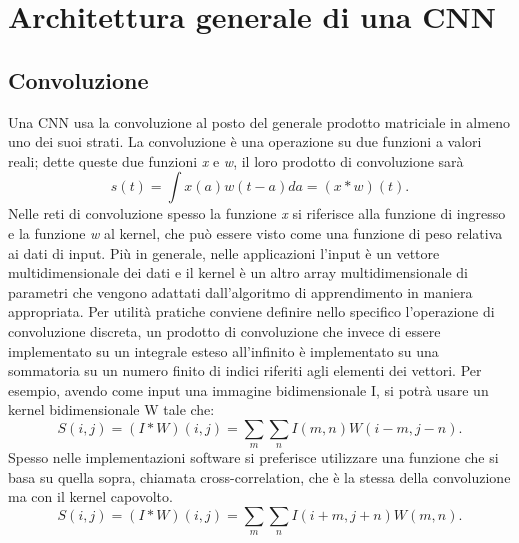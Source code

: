 \section{Architettura generale di una CNN}
\subsection{Convoluzione}
Una CNN usa la convoluzione al posto del generale prodotto matriciale in 
almeno uno dei suoi strati. 
La convoluzione è una operazione su due funzioni a valori reali; 
dette queste due funzioni \emph{x} e \emph{w}, il loro prodotto di convoluzione sarà
\[s(t) = \int x(a)w(t-a) da = (x * w) (t).\]
Nelle reti di convoluzione spesso la funzione \emph{x} si riferisce
 alla funzione di ingresso e la funzione \emph{w} al kernel, che può essere visto come una funzione
  di peso relativa ai dati di input. Più in generale, nelle applicazioni l’input 
  è un vettore multidimensionale dei dati e il kernel è un altro array 
  multidimensionale di parametri che vengono adattati dall’algoritmo di
   apprendimento in maniera appropriata. Per utilità pratiche conviene 
   definire nello specifico l’operazione di convoluzione discreta, 
   un prodotto di convoluzione che invece di essere implementato su un integrale
    esteso all’infinito è implementato su una sommatoria su un numero finito di 
    indici riferiti agli elementi dei vettori. Per esempio, avendo come input
     una immagine bidimensionale I, si potrà usare un kernel bidimensionale W tale che:
\[S(i, j) = ( I * W )(i, j) = \sum_{m}\sum_{n} I(m, n)W(i-m, j-n).\]
Spesso nelle implementazioni software si preferisce utilizzare una funzione che si basa su quella sopra,
 chiamata cross-correlation, che è la stessa della convoluzione ma con
  il kernel capovolto. 
  \[S(i, j) = ( I * W )(i, j) = \sum_{m}\sum_{n} I(i+m, j+n)W(m, n).\]

